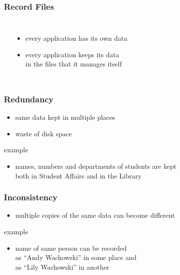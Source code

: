 \documentclass[dvipsnames]{beamer}
\theoremstyle{plain}
\begin{document}
\begin{frame}
  \frametitle{Record Files}

  \begin{columns}[b]
    \begin{center}
    \end{center}

    \begin{itemize}
      \item every application has its own data
      \item every application keeps its data\\
        in the files that it manages itself
    \end{itemize}
  \end{columns}
\end{frame}

\begin{frame}
  \frametitle{Redundancy}

  \begin{itemize}
    \item same data kept in multiple places
    \item waste of disk space
  \end{itemize}

  \medskip
  \begin{exampleblock}{example}
    \begin{itemize}
      \item names, numbers and departments of students are kept\\
        both in Student Affairs and in the Library
    \end{itemize}
  \end{exampleblock}
\end{frame}

\begin{frame}
  \frametitle{Inconsistency}

  \begin{itemize}
    \item multiple copies of the same data can become different
  \end{itemize}

  \medskip
  \begin{exampleblock}{example}
    \begin{itemize}
      \item name of same person can be recorded\\
        as ``Andy Wachowski'' in some place and\\
        as ``Lily Wachowski'' in another
    \end{itemize}
  \end{exampleblock}
\end{frame}
\end{document}
